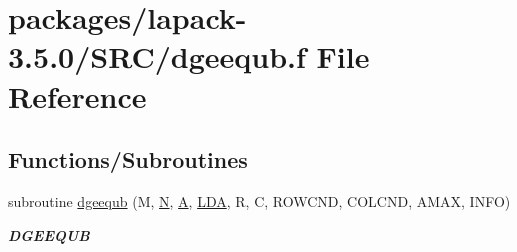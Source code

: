 \hypertarget{dgeequb_8f}{}\section{packages/lapack-\/3.5.0/\+S\+R\+C/dgeequb.f File Reference}
\label{dgeequb_8f}
\subsection*{Functions/\+Subroutines}
\begin{DoxyCompactItemize}
\item 
subroutine \hyperlink{group__doubleGEcomputational_ga4547be7cf34938979c5d741d148e4d3b}{dgeequb} (M, \hyperlink{polmisc_8c_a0240ac851181b84ac374872dc5434ee4}{N}, \hyperlink{classA}{A}, \hyperlink{example__user_8c_ae946da542ce0db94dced19b2ecefd1aa}{L\+D\+A}, R, C, R\+O\+W\+C\+N\+D, C\+O\+L\+C\+N\+D, A\+M\+A\+X, I\+N\+F\+O)
\begin{DoxyCompactList}\small\item\em {\bfseries D\+G\+E\+E\+Q\+U\+B} \end{DoxyCompactList}\end{DoxyCompactItemize}
